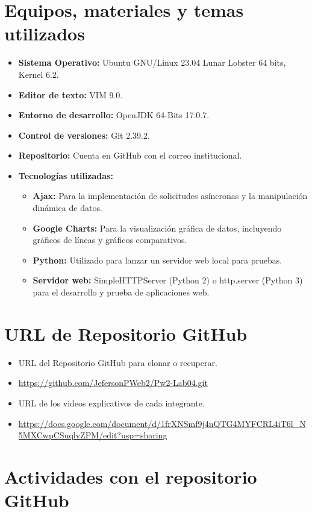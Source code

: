 \documentclass{article}
\begin{document}
\section{Equipos, materiales y temas utilizados}
\begin{itemize}
    \item \textbf{Sistema Operativo:} Ubuntu GNU/Linux 23.04 Lunar Lobster 64 bits, Kernel 6.2.
    \item \textbf{Editor de texto:} VIM 9.0.
    \item \textbf{Entorno de desarrollo:} OpenJDK 64-Bits 17.0.7.
    \item \textbf{Control de versiones:} Git 2.39.2.
    \item \textbf{Repositorio:} Cuenta en GitHub con el correo institucional.
    \item \textbf{Tecnologías utilizadas:}
    \begin{itemize}
        \item \textbf{Ajax:} Para la implementación de solicitudes asíncronas y la manipulación dinámica de datos.
        \item \textbf{Google Charts:} Para la visualización gráfica de datos, incluyendo gráficos de líneas y gráficos comparativos.
        \item \textbf{Python:} Utilizado para lanzar un servidor web local para pruebas.
        \item \textbf{Servidor web:} SimpleHTTPServer (Python 2) o http.server (Python 3) para el desarrollo y prueba de aplicaciones web.
    \end{itemize}
\end{itemize}

\section{URL de Repositorio GitHub}
\begin{itemize}
    \item URL del Repositorio GitHub para clonar o recuperar.
    \item \url{https://github.com/JefersonPWeb2/Pw2-Lab04.git}
    \item URL de los videos explicativos de cada integrante.
    \item \url{https://docs.google.com/document/d/1frXNSmf9j4nQTG4MYFCRL4iT6l_N5MXCwpCSuqlvZPM/edit?usp=sharing}
\end{itemize}

\section{Actividades con el repositorio GitHub}
\end{document}
